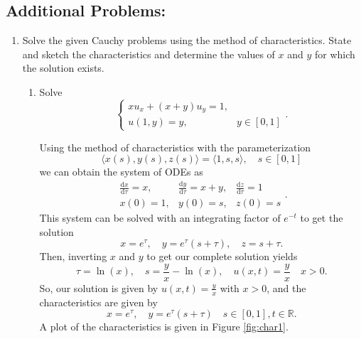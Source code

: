 \documentclass[a4paper,12pt]{article}
\newcommand{\reals}{\mathbb{R}}
\newcommand{\dd}{\mathrm{d}}
\begin{document}
\subsection*{Additional Problems:}
	\begin{enumerate}[label = \arabic*.]
		\item Solve the given Cauchy problems using the method of characteristics. State and sketch the characteristics and determine the values of $ x $ and $ y $ for which the solution exists.
		\begin{enumerate}[label = (\alph*)]
			\item Solve
			\[
				\begin{cases}
					x u_x + (x + y)u_y = 1, \\
					u(1,y) = y, & y \in [0,1]
				\end{cases}.
			\]
			
			Using the method of characteristics with the parameterization
			\[
				\langle x(s), y(s), z(s) \rangle = \langle 1, s, s \rangle, \quad s \in [0,1]
			\]
			we can obtain the system of ODEs as
			\[
				\begin{array}{ccc}
					\frac{\dd x}{\dd \tau} = x, & \frac{\dd y}{\dd \tau} = x + y, & \frac{\dd z}{\dd \tau} = 1 \\
					x(0) = 1, & y(0) = s, & z(0) = s
				\end{array}.
			\]
			This system can be solved with an integrating factor of $ e^{-t} $ to get the solution
			\[
				x = e^\tau, \quad y = e^\tau (s + \tau), \quad z = s + \tau.
			\]
			Then, inverting $ x $ and $ y $ to get our complete solution yields
			\[
				\tau = \ln(x), \quad s = \frac{y}{x} - \ln(x), \quad u(x,t) = \frac{y}{x} \quad x > 0.
			\]
			So, our solution is given by $ u(x, t) = \frac{y}{x} $ with $ x > 0 $, and the characteristics are given by
			\[
				x = e^\tau, \quad y = e^\tau (s + \tau) \quad s \in [0, 1], t \in \reals.
			\]
			A plot of the characteristics is given in Figure \ref{fig:char1}.
			

\end{enumerate}
\end{enumerate}
\end{document}
